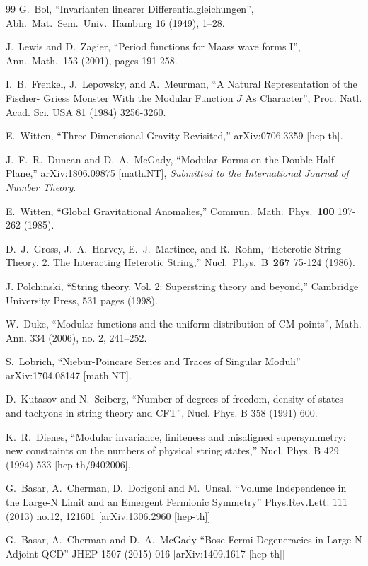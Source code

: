 \documentclass[11pt,a4paper]{article}
\begin{document}
\begin{thebibliography}{99}
G.~Bol, 
``Invarianten linearer Differentialgleichungen'', 
Abh.~Mat.~Sem.~Univ.~Hamburg 16 (1949), 1--28.


J.~Lewis and D.~Zagier, 
``Period functions for Maass wave forms I'', 
Ann.~Math.~153 (2001), pages 191-258.


I.~B.~Frenkel, J.~Lepowsky, and A.~Meurman, ``A Natural Representation of the Fischer- Griess Monster With the Modular Function $J$ As Character'', Proc. Natl. Acad. Sci. USA 81 (1984) 3256-3260.

E.~Witten, ``Three-Dimensional Gravity Revisited,''
arXiv:0706.3359 [hep-th].


J.~F.~R.~Duncan and D.~A.~McGady,
``Modular Forms on the Double Half-Plane,'' arXiv:1806.09875 [math.NT], {\em Submitted to the International Journal of Number Theory}.


E.~Witten, 
``Global Gravitational Anomalies,''
Commun.~Math.~Phys.~{\bf 100} 197-262 (1985).


D.~J.~Gross, J.~A.~Harvey, E.~J.~Martinec, and R.~Rohm, 
``Heterotic String Theory. 2. The Interacting Heterotic String,''
Nucl.~Phys.~B~{\bf 267} 75-124 (1986).


J. Polchinski, 
``String theory. Vol. 2: Superstring theory and beyond,''
Cambridge University Press, 531 pages (1998).


W.~Duke, 
``Modular functions and the uniform distribution of CM points'',
Math. Ann. 334 (2006), no. 2, 241--252.


S.~Lobrich,
``Niebur-Poincare Series and Traces of Singular Moduli''
arXiv:1704.08147 [math.NT].


D.~Kutasov and N.~Seiberg, 
``Number of degrees of freedom, density of states and tachyons in string theory and CFT'', 
Nucl. Phys. B 358 (1991) 600.

K.~R.~Dienes, 
``Modular invariance, finiteness and misaligned supersymmetry: new constraints on the numbers of physical string states,'' Nucl. Phys. B 429 (1994) 533 [hep-th/9402006].

G.~Basar, A.~Cherman, D.~Dorigoni and M.~Unsal.
``Volume Independence in the Large-N Limit and an Emergent Fermionic Symmetry''
Phys.Rev.Lett. 111 (2013) no.12, 121601 
[arXiv:1306.2960 [hep-th]]

G.~Basar, A.~Cherman and D.~A.~McGady 
``Bose-Fermi Degeneracies in Large-N Adjoint QCD''
JHEP 1507 (2015) 016 
[arXiv:1409.1617 [hep-th]]


\end{thebibliography}
\end{document}
